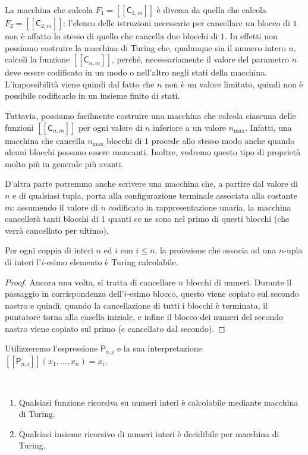 \begin{rema}
La macchina che calcola $F_1=[[\mathsf C_{1,m}]]$ è diversa da quella che calcola $F_2=[[\mathsf C_{2,m}]]$: l'elenco delle istruzioni necessarie per cancellare un blocco di $1$ non è affatto lo stesso di quello che cancella due blocchi di $1$. In effetti non possiamo costruire la macchina di Turing che, qualunque sia il numero intero $n$, calcoli la funzione $[[\mathsf C_{n,m}]]$, perché, necessariamente il valore del parametro $n$ deve essere codificato in un modo o nell'altro negli stati della macchina. L'impossibilità viene quindi dal fatto che $n$ non è un valore limitato, quindi non è possibile codificarlo in un insieme finito di stati.

Tuttavia, possiamo facilmente costruire una macchina che calcola ciascuna delle funzioni $[[\mathsf C_{n,m}]]$ per ogni valore di $n$ inferiore a un valore $n_{\max}$. Infatti, una macchina che cancella $n_{\max}$ blocchi di $1$ procede allo stesso modo anche quando alcuni blocchi possono essere mancanti. Inoltre, vedremo questo tipo di proprietà molto più in generale più avanti.

D'altra parte potremmo anche scrivere una macchina che, a partire dal valore di $n$ e di qualsiasi tupla, porta alla configurazione terminale associata alla costante $m$: assumendo il valore di $n$ codificato in rappresentazione unaria, la macchina cancellerà tanti blocchi di $1$ quanti ce ne sono nel primo di questi blocchi (che verrà cancellato per ultimo).
\end{rema}

\begin{lemm}
Per ogni coppia di interi $n$ ed $i$ con $i\leq n$, la proiezione che associa ad una $n$-upla di interi l'$i$-esimo elemento è Turing calcolabile.
\end{lemm}

\begin{proof}
Ancora una volta, si tratta di cancellare $n$ blocchi di numeri. Durante il passaggio in corrispondenza dell'$i$-esimo blocco, questo viene copiato sul secondo nastro e quindi, quando la cancellazione di tutti i blocchi è terminata, il puntatore torna alla casella iniziale, e infine il blocco dei numeri del secondo nastro viene copiato sul primo (e cancellato dal secondo).
\end{proof}
Utilizzeremo l'espressione $\mathsf P_{n,i}$ e la sua interpretazione $[[\mathsf P_{n,i}]](x_1,\dots,x_n)=x_i$.
\begin{prop}\
\begin{enumerate}
    \item Qualsiasi funzione ricorsiva su numeri interi è calcolabile mediante macchina di Turing.
    \item Qualsiasi insieme ricorsivo di numeri interi è decidibile per macchina di Turing.
\end{enumerate}
\end{prop}

